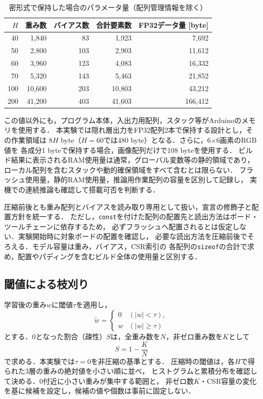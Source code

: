 \documentclass[a4paper,11pt]{article}
\begin{document}
\begin{table}[htbp]
  \centering
  \caption{密形式で保持した場合のパラメータ量（配列管理情報を除く）}
  \label{tab:dense-size}
  \begin{tabular}{rrrrr}
    \toprule
    $H$ & 重み数 & バイアス数 & 合計要素数 & FP32データ量 [byte] \\
    \midrule
     40 &  1,840 &  83 &  1,923 &   7,692 \\
     50 &  2,800 & 103 &  2,903 &  11,612 \\
     60 &  3,960 & 123 &  4,083 &  16,332 \\
     70 &  5,320 & 143 &  5,463 &  21,852 \\
    100 & 10,600 & 203 & 10,803 &  43,212 \\
    200 & 41,200 & 403 & 41,603 & 166,412 \\
    \bottomrule
  \end{tabular}
\end{table}

この値以外にも，プログラム本体，入出力用配列，スタック等がArduinoのメモリを使用する．
本実験では隠れ層出力をFP32配列2本で保持する設計とし，その作業領域は
$8H$ byte（$H=60$では480 byte）となる．さらに，6$\times$6画素のRGB値を
各成分1 byteで保持する場合，画像配列だけで108 byteを使用する．
ビルド結果に表示されるRAM使用量は通常，グローバル変数等の静的領域であり，
ローカル配列を含むスタックや動的確保領域をすべて含むとは限らない．
フラッシュ使用量，静的RAM使用量，推論用作業配列の容量を区別して記録し，
実機での連続推論も確認して搭載可否を判断する．

圧縮前後とも重み配列とバイアスを読み取り専用として扱い，宣言の修飾子と配置方針を統一する．
ただし，\texttt{const}を付けた配列の配置先と読出方法はボード・ツールチェーンに依存するため，
必ずフラッシュへ配置されるとは仮定しない．実験開始時に対象ボードの配置を確認し，
必要な読出方法を圧縮前後でそろえる．モデル容量は重み，バイアス，CSR索引の
各配列の\texttt{sizeof}の合計で求め，配置やパディングを含むビルド全体の使用量と区別する．

\subsection{閾値による枝刈り}

学習後の重み$w$に閾値$\tau$を適用し，
\begin{equation}
  \widetilde{w}=\begin{cases}
    0 & (|w|<\tau),\\
    w & (|w|\geq\tau)
  \end{cases}
\end{equation}
とする．0となった割合（疎性）$S$は，全重み数を$N$，非ゼロ重み数を$K$として
\begin{equation}
  S=1-\frac{K}{N}
\end{equation}
で求める．本実験では$\tau=0$を非圧縮の基準とする．
圧縮時の閾値は，各$H$で得られた3層の重みの絶対値を小さい順に並べ，
ヒストグラムと累積分布を確認して決める．0付近に小さい重みが集中する範囲と，
非ゼロ数$K$・CSR容量の変化を基に候補を設定し，候補の値や個数は事前に固定しない．
\end{document}
